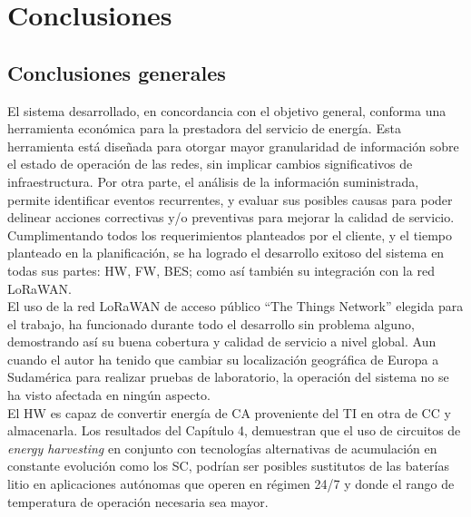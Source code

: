 
\chapter{Conclusiones} %

\label{Chapter5} %




\section{Conclusiones generales }
El sistema desarrollado, en concordancia con el objetivo general, conforma una herramienta económica para la prestadora del servicio de energía. Esta herramienta está diseñada para otorgar mayor granularidad de información sobre el estado de operación de las redes, sin implicar cambios significativos de infraestructura. Por otra parte, el análisis de la información suministrada, permite identificar eventos recurrentes, y evaluar sus posibles causas para poder delinear acciones correctivas y/o preventivas para mejorar la calidad de servicio.\\
Cumplimentando todos los requerimientos planteados por el cliente, y el tiempo planteado en la planificación, se ha logrado el desarrollo exitoso del sistema en todas sus partes: HW, FW, BES; como así también su integración con la red LoRaWAN.\\
El uso de la red LoRaWAN de acceso público “The Things Network” elegida para el trabajo, ha funcionado durante todo el desarrollo sin problema alguno, demostrando así su buena cobertura y calidad de servicio a nivel global. Aun cuando el autor ha tenido que cambiar su localización geográfica de Europa a Sudamérica para realizar pruebas de laboratorio, la operación del sistema no se ha visto afectada en ningún aspecto.\\
El HW es capaz de convertir energía de CA proveniente del TI en otra de CC y almacenarla. Los resultados del Capítulo 4, demuestran que el uso de circuitos de \textit{energy harvesting} en conjunto con tecnologías alternativas de acumulación en constante evolución como los SC, podrían ser posibles sustitutos de las baterías litio en aplicaciones autónomas que operen en régimen 24/7 y donde el rango de temperatura de operación necesaria sea mayor.\\
